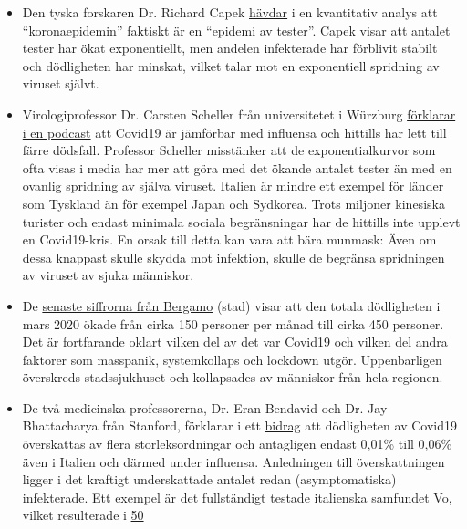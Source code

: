 \begin{itemize}
\tightlist
\item
  Den tyska forskaren Dr. Richard Capek
  \href{https://coronadaten.wordpress.com/}{hävdar} i en kvantitativ
  analys att ``koronaepidemin'' faktiskt är en ``epidemi av tester''.
  Capek visar att antalet tester har ökat exponentiellt, men andelen
  infekterade har förblivit stabilt och dödligheten har minskat, vilket
  talar mot en exponentiell spridning av viruset självt.
\item
  Virologiprofessor Dr. Carsten Scheller från universitetet i Würzburg
  \href{https://www.youtube.com/watch?v=w-uub0urNfw}{förklarar i en
  podcast} att Covid19 är jämförbar med influensa och hittills har lett
  till färre dödsfall. Professor Scheller misstänker att de
  exponentialkurvor som ofta visas i media har mer att göra med det
  ökande antalet tester än med en ovanlig spridning av själva viruset.
  Italien är mindre ett exempel för länder som Tyskland än för exempel
  Japan och Sydkorea. Trots miljoner kinesiska turister och endast
  minimala sociala begränsningar har de hittills inte upplevt en
  Covid19-kris. En orsak till detta kan vara att bära munmask: Även om
  dessa knappast skulle skydda mot infektion, skulle de begränsa
  spridningen av viruset av sjuka människor.
\item
  De
  \href{https://www.ecodibergamo.it/stories/bergamo-citta/a-bergamo-decessi-4-volte-oltre-la-medialeco-lancia-unindagine-nei-comuni_1346651_11/}{senaste
  siffrorna från Bergamo} (stad) visar att den totala dödligheten i mars
  2020 ökade från cirka 150 personer per månad till cirka 450 personer.
  Det är fortfarande oklart vilken del av det var Covid19 och vilken del
  andra faktorer som masspanik, systemkollaps och lockdown utgör.
  Uppenbarligen överskreds stadssjukhuset och kollapsades av människor
  från hela regionen.
\item
  De två medicinska professorerna, Dr. Eran Bendavid och Dr. Jay
  Bhattacharya från Stanford, förklarar i ett
  \href{https://web.archive.org/web/20200325103650/https://www.wsj.com/articles/is-the-coronavirus-as-deadly-as-they-say-11585088464}{bidrag}
  att dödligheten av Covid19 överskattas av flera storleksordningar och
  antagligen endast 0,01\% till 0,06\% även i Italien och därmed under
  influensa. Anledningen till överskattningen ligger i det kraftigt
  underskattade antalet redan (asymptomatiska) infekterade. Ett exempel
  är det fullständigt testade italienska samfundet Vo, vilket
  resulterade i
  \href{https://www.repubblica.it/salute/medicina-e-ricerca/2020/03/16/news/coronavirus_studio_il_50-75_dei_casi_a_vo_sono_asintomatici_e_molto_contagiosi-251474302/}{50
}
\end{itemize}
